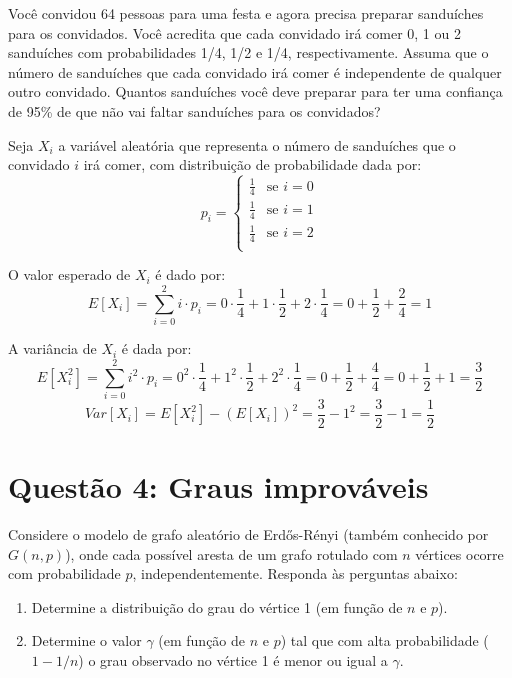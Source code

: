 \documentclass[12 pt]{article}
\begin{document}
Você convidou 64 pessoas para uma festa e agora precisa preparar sanduíches para os convidados. Você acredita que cada convidado irá comer 0, 1 ou 2 sanduíches com probabilidades 1/4, 1/2 e 1/4, respectivamente. Assuma que o número de sanduíches que cada convidado irá comer é independente de qualquer outro convidado. Quantos sanduíches você deve preparar para ter uma confiança de 95\% de que não vai faltar sanduíches para os convidados?
\begin{tcolorbox}[colframe=black, title=Resposta:]
    Seja $X_i$ a variável aleatória que representa o número de sanduíches que o convidado $i$ irá comer, com distribuição de probabilidade dada por:
    $$
    p_i = \begin{cases}
    \frac{1}{4} & \text{se } i=0 \\
    \frac{1}{4} & \text{se } i=1 \\
    \frac{1}{4} & \text{se } i=2 \\
    \end{cases}
    $$

    O valor esperado de $X_i$ é dado por:
    $$
    E[X_i] = \sum_{i=0}^2 i \cdot p_i = 0 \cdot \frac{1}{4} + 1 \cdot \frac{1}{2} + 2 \cdot \frac{1}{4} = 0 + \frac{1}{2} + \frac{2}{4} = 1
    $$

    A variância de $X_i$ é dada por:
    $$
    E[X_i^2] = \sum_{i=0}^2 i^2 \cdot p_i = 0^2 \cdot \frac{1}{4} + 1^2 \cdot \frac{1}{2} + 2^2 \cdot \frac{1}{4} = 0 + \frac{1}{2} + \frac{4}{4} = 0 + \frac{1}{2} + 1 = \frac{3}{2}
    $$
    $$
    Var[X_i] = E[X_i^2] - (E[X_i])^2 = \frac{3}{2} - 1^2 = \frac{3}{2} - 1 = \frac{1}{2}
    $$


\end{tcolorbox}

\section*{Questão 4: Graus improváveis}

Considere o modelo de grafo aleatório de Erdős-Rényi (também conhecido por $G(n, p)$), onde cada possível aresta de um grafo rotulado com $n$ vértices ocorre com probabilidade $p$, independentemente. Responda às perguntas abaixo:

\begin{enumerate}
    \item Determine a distribuição do grau do vértice 1 (em função de $n$ e $p$).
    \begin{tcolorbox}[colframe=black, title=Resposta:]

    \end{tcolorbox}
    \item Determine o valor $\gamma$ (em função de $n$ e $p$) tal que com alta probabilidade ($1 - 1/n$) o grau observado no vértice 1 é menor ou igual a $\gamma$.
    \begin{tcolorbox}[colframe=black, title=Resposta:]

    \end{tcolorbox}
\end{enumerate}
\end{document}
